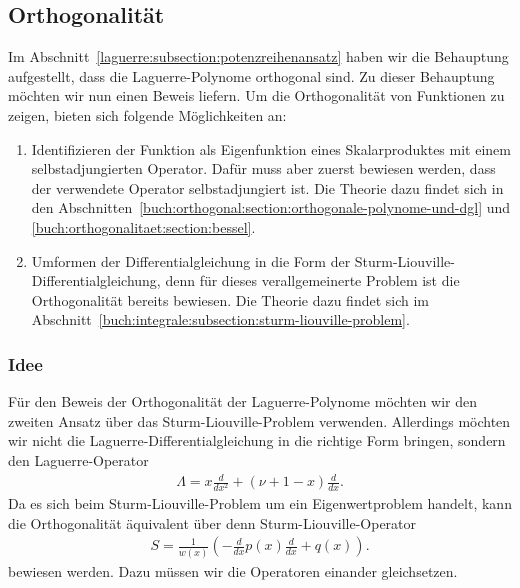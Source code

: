 %
%
%
\subsection{Orthogonalität%
\label{laguerre:subsection:orthogonal}}
%
Im Abschnitt~\ref{laguerre:subsection:potenzreihenansatz}
haben wir die Behauptung aufgestellt,
dass die Laguerre-Polynome orthogonal sind.
Zu dieser Behauptung möchten wir nun einen Beweis liefern.
%
Um die Orthogonalität von Funktionen zu zeigen,
bieten sich folgende Möglichkeiten an:
\begin{enumerate}
\item Identifizieren der Funktion als Eigenfunktion eines Skalarproduktes
mit einem selbstadjungierten Operator.
Dafür muss aber zuerst bewiesen werden,
dass der verwendete Operator selbstadjungiert ist.
Die Theorie dazu findet sich in den
Abschnitten~\ref{buch:orthogonal:section:orthogonale-polynome-und-dgl} und
\ref{buch:orthogonalitaet:section:bessel}.
\item Umformen der Differentialgleichung in die Form der
Sturm-Liouville-Differentialgleichung,
denn für dieses verallgemeinerte Problem
ist die Orthogonalität bereits bewiesen.
Die Theorie dazu findet sich im Abschnitt~\ref{buch:integrale:subsection:sturm-liouville-problem}.
\end{enumerate}

\subsubsection{Idee}
Für den Beweis der Orthogonalität der Laguerre-Polynome möchten
wir den zweiten Ansatz über das Sturm-Liouville-Problem verwenden.
Allerdings möchten wir nicht die Laguerre-Differentialgleichung
in die richtige Form bringen,
sondern den Laguerre-Operator
\begin{align}
\Lambda
=
x \frac{d}{dx^2} + (\nu + 1 -x) \frac{d}{dx}
\label{laguerre:lagop}
.
\end{align}
Da es sich beim Sturm-Liouville-Problem um ein Eigenwertproblem handelt,
kann die Orthogonalität äquivalent über denn Sturm-Liouville-Operator
\begin{align}
S
=
\frac{1}{w(x)} \left(-\frac{d}{dx}p(x) \frac{d}{dx} + q(x) \right).
\label{laguerre:slop}
\end{align}
bewiesen werden.
Dazu müssen wir die Operatoren einander gleichsetzen.

